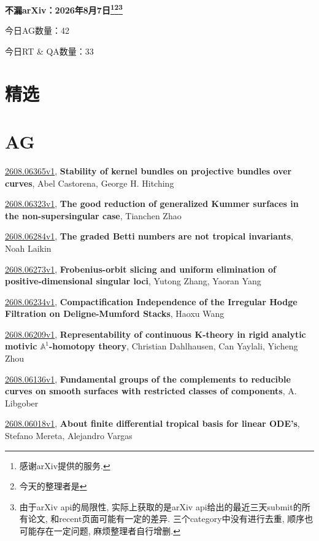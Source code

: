 \documentclass[9pt, a4paper]{article}
\theoremstyle{plain}
\theoremstyle{definition}
\theoremstyle{remark}
\newcommand{\arxiv}[3]{\href{https://arxiv.org/abs/#1}{#1}, \textbf{\textcolor{arxivblue}{#2}}, #3}
\newcommand{\AGnumber}{42}
\newcommand{\RTQAnumber}{33}
\newcommand{\NewestDate}{2026年8月7日}
\newcommand{\todayarXiver}{} %
\begin{document}
\begin{center}
    \Huge\textbf{不漏arXiv：\NewestDate\footnote{感谢arXiv提供的服务.}\footnote{今天的整理者是\todayarXiver}\footnote{由于arXiv api的局限性, 实际上获取的是arXiv api给出的最近三天submit的所有论文, 和recent页面可能有一定的差异. 三个category中没有进行去重, 顺序也可能存在一定问题, 麻烦整理者自行增删.}} \\
\end{center}

\setcounter{section}{-1}

\begin{center}
    今日AG数量：\AGnumber
    
    今日RT \& QA数量：\RTQAnumber
    
\end{center}


\section{精选}


\section{AG}
\arxiv{2608.06365v1}{Stability of kernel bundles on projective bundles over curves}{Abel Castorena, George H. Hitching}

\arxiv{2608.06323v1}{The good reduction of generalized Kummer surfaces in the non-supersingular case}{Tianchen Zhao}

\arxiv{2608.06284v1}{The graded Betti numbers are not tropical invariants}{Noah Laikin}

\arxiv{2608.06273v1}{Frobenius-orbit slicing and uniform elimination of positive-dimensional singular loci}{Yutong Zhang, Yaoran Yang}

\arxiv{2608.06234v1}{Compactification Independence of the Irregular Hodge Filtration on Deligne-Mumford Stacks}{Haoxu Wang}

\arxiv{2608.06209v1}{Representability of continuous K-theory in rigid analytic motivic $\mathbb{A}^1$-homotopy theory}{Christian Dahlhausen, Can Yaylali, Yicheng Zhou}

\arxiv{2608.06136v1}{Fundamental groups of the complements to reducible curves on smooth surfaces with restricted classes of components}{A. Libgober}

\arxiv{2608.06018v1}{About finite differential tropical basis for linear ODE's}{Stefano Mereta, Alejandro Vargas}
\end{document}
